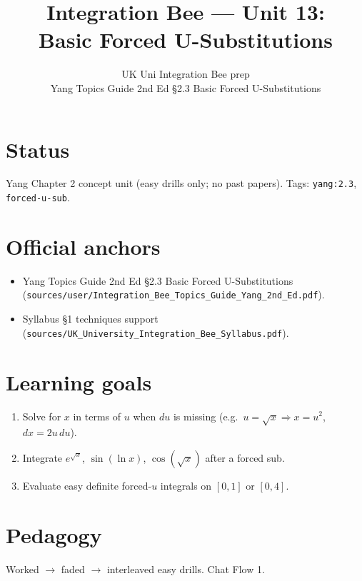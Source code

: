 
\title{Integration Bee --- Unit 13:\\ Basic Forced U-Substitutions}
\author{UK Uni Integration Bee prep\\ Yang Topics Guide 2nd Ed §2.3 Basic Forced U-Substitutions}
\date{}

\maketitle

\section*{Status}
Yang Chapter 2 concept unit (easy drills only; no past papers).
Tags: \texttt{yang:2.3}, \texttt{forced-u-sub}.

\section{Official anchors}
\begin{itemize}
  \item Yang Topics Guide 2nd Ed §2.3 Basic Forced U-Substitutions
        (\texttt{sources/user/Integration\_Bee\_Topics\_Guide\_Yang\_2nd\_Ed.pdf}).
  \item Syllabus §1 techniques support
        (\texttt{sources/UK\_University\_Integration\_Bee\_Syllabus.pdf}).
\end{itemize}

\section{Learning goals}
\begin{enumerate}
  \item Solve for $x$ in terms of $u$ when $du$ is missing (e.g.\ $u=\sqrt{x}\Rightarrow x=u^{2}$, $dx=2u\,du$).
  \item Integrate $e^{\sqrt{x}}$, $\sin(\ln x)$, $\cos(\sqrt{x})$ after a forced sub.
  \item Evaluate easy definite forced-$u$ integrals on $[0,1]$ or $[0,4]$.
\end{enumerate}

\section{Pedagogy}
Worked $\to$ faded $\to$ interleaved easy drills. Chat Flow 1.

